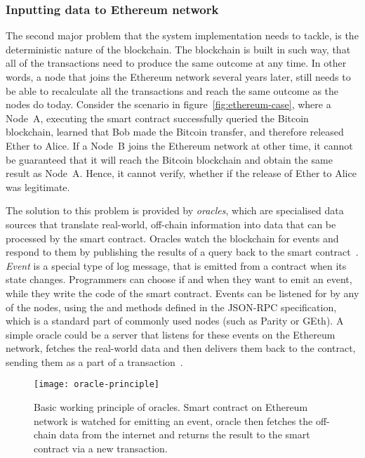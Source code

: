 \subsubsection{Inputting data to Ethereum network}\label{sec:data-input}
The second major problem that the system implementation needs to tackle, is the deterministic nature of the blockchain. The blockchain is built in such way, that all of the transactions need to produce the same outcome at any time. In other words, a node that joins the Ethereum network several years later, still needs to be able to recalculate all the transactions and reach the same outcome as the nodes do today. Consider the scenario in figure~\ref{fig:ethereum-case}, where a Node~A, executing the smart contract successfully queried the Bitcoin blockchain, learned that Bob made the Bitcoin transfer, and therefore released Ether to Alice. If a Node~B joins the Ethereum network at other time, it cannot be guaranteed that it will reach the Bitcoin blockchain and obtain the same result as Node~A. Hence, it cannot verify, whether if the release of Ether to Alice was legitimate.

The solution to this problem is provided by \textit{oracles}, which are specialised data sources that translate real-world, off-chain information into data that can be processed by the smart contract. Oracles watch the blockchain for events and respond to them by publishing the results of a query back to the smart contract~\cite{JohnWeldon2016BuildingContract}. \textit{Event} is a special type of log message, that is emitted from a contract when its state changes. Programmers can choose if and when they want to emit an event, while they write the code of the smart contract. Events can be listened for by any of the nodes, using the  and  methods defined in the JSON-RPC specification\footnotemark, which is a standard part of commonly used nodes (such as Parity or GEth). A simple oracle could be a server that listens for these events on the Ethereum network, fetches the real-world data and then delivers them back to the contract, sending them as a part of a transaction~\cite{JulesDourlens2017Oracles:Blockchain, 2018OraclizeDocumentation}. 
% 
% 
\begin{figure}[ht]
    \centering
    \texttt{[image: oracle-principle]}
    \caption{Basic working principle of oracles. Smart contract on Ethereum network is watched for emitting an event, oracle then fetches the off-chain data from the internet and returns the result to the smart contract via a new transaction.}
    \label{fig:oracles-principle}
\end{figure}

